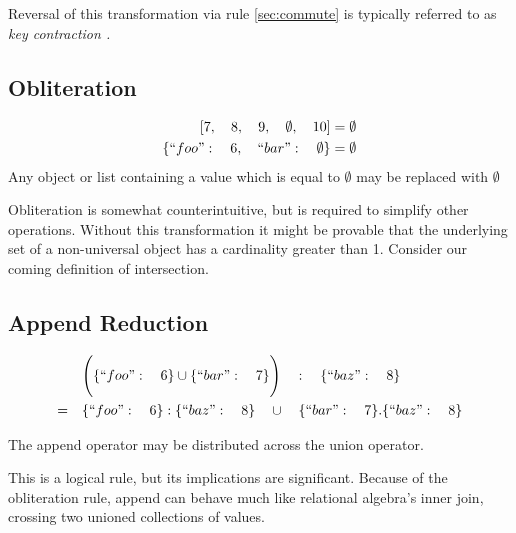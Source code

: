 \documentclass[letterpaper]{article}
\begin{document}
Reversal of this transformation via rule \ref{sec:commute} is typically
referred to as \em key contraction \em .

\subsection{Obliteration}
\begin{prule}
\begin{equation}
\begin{split}
{[}7,\quad8,\quad9,\quad\emptyset,\quad10] & = \emptyset \\
\{``foo":\quad6,\quad``bar":\quad\emptyset\} & = \emptyset
\end{split}
\end{equation}
Any object or list containing a value which is equal to \(\emptyset\) may be
replaced with \(\emptyset\)
\end{prule}

Obliteration is somewhat counterintuitive, but is required to simplify other
operations. Without this transformation it might be provable that the
underlying set of a non-universal object has a cardinality greater than 1.
Consider our coming definition of intersection.

\subsection{Append Reduction}

\begin{prule}
\begin{equation}
\begin{split}
& \Bigg( \{``foo":\quad6\} \cup \{``bar":\quad7\} \Bigg) \quad : \quad
\{``baz":\quad8\} \\
= \quad& \{``foo":\quad6\} : \{``baz":\quad8\} \quad \cup \quad \{``bar":\quad7\}
 . \{``baz":\quad8\}
\end{split}
\end{equation}

The append operator may be distributed across the union operator.
\end{prule}

This is a logical rule, but its implications are significant. Because of the
obliteration rule, append can behave much like relational algebra's inner join,
crossing two unioned collections of values.
\end{document}
